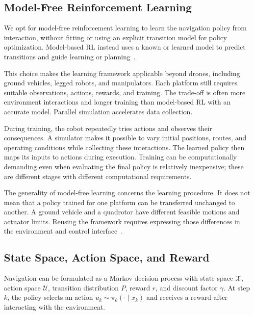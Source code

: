 \subsection{Model-Free Reinforcement Learning}
We opt for model-free reinforcement learning to learn the navigation policy from interaction, without fitting or using an explicit transition model for policy optimization. Model-based RL instead uses a known or learned model to predict transitions and guide learning or planning~\cite{litSutton2018}.

This choice makes the learning framework applicable beyond drones, including ground vehicles, legged robots, and manipulators. Each platform still requires suitable observations, actions, rewards, and training. The trade-off is often more environment interactions and longer training than model-based RL with an accurate model. Parallel simulation accelerates data collection.

During training, the robot repeatedly tries actions and observes their consequences. A simulator makes it possible to vary initial positions, routes, and operating conditions while collecting these interactions. The learned policy then maps its inputs to actions during execution. Training can be computationally demanding even when evaluating the final policy is relatively inexpensive; these are different stages with different computational requirements.

The generality of model-free learning concerns the learning procedure. It does not mean that a policy trained for one platform can be transferred unchanged to another. A ground vehicle and a quadrotor have different feasible motions and actuator limits. Reusing the framework requires expressing those differences in the environment and control interface~\cite{litSutton2018}.

\subsection{State Space, Action Space, and Reward}
\label{lit:rl}
Navigation can be formulated as a Markov decision process with state space $\mathcal X$, action space $\mathcal U$, transition distribution $P$, reward $r$, and discount factor $\gamma$. At step $k$, the policy selects an action $u_k\sim\pi_\theta(\cdot\mid x_k)$ and receives a reward after interacting with the environment.

